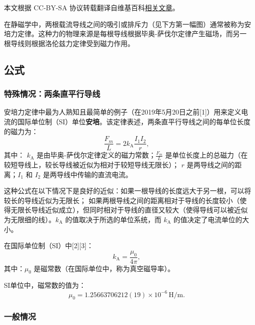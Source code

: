 
本文根据 CC-BY-SA 协议转载翻译自维基百科\href{https://en.wikipedia.org/wiki/Amp\%C3\%A8re\%27s_force_law}{相关文章}。

在静磁学中，两根载流导线之间的吸引或排斥力（见下方第一幅图）通常被称为安培力定律。这种力的物理来源是每根导线根据毕奥-萨伐尔定律产生磁场，而另一根导线则根据洛伦兹力定律受到磁力作用。

\subsection{公式}
\subsubsection{特殊情况：两条直平行导线}
安培力定律中最为人熟知且最简单的例子（在2019年5月20日之前[1]）用来定义电流的国际单位制（SI）单位\textbf{安培}。该定律表述，两条直平行导线之间的每单位长度的磁力为：
\[
\frac{F_m}{L} = 2k_{\text{A}} \frac{I_1 I_2}{r},~
\]
其中： \( k_{\text{A}} \) 是由毕奥-萨伐尔定律定义的磁力常数；\( \frac{F_m}{L} \) 是单位长度上的总磁力（在较短导线上，较长导线被近似为相对于较短导线无限长）； \( r \) 是两导线之间的距离；\( I_1 \) 和 \( I_2 \) 是两导线中传输的直流电流。

这种公式在以下情况下是良好的近似：如果一根导线的长度远大于另一根，可以将较长的导线近似为无限长；
如果两根导线之间的距离相对于导线的长度较小（使得无限长导线近似成立），但同时相对于导线的直径又较大（使得导线可以被近似为无限细的线）。\( k_{\text{A}} \) 的值取决于所选的单位系统，而 \( k_{\text{A}} \) 的值决定了电流单位的大小。

在国际单位制（SI）中[2][3]：
\[
k_{\text{A}} = \frac{\mu_0}{4\pi},~
\]
其中：\( \mu_0 \) 是磁常数（在国际单位中，称为真空磁导率）。

SI单位中，磁常数的值为：
\[
\mu_0 = 1.25663706212(19) \times 10^{-6} \, \text{H/m}.~
\]
\subsubsection{一般情况}

